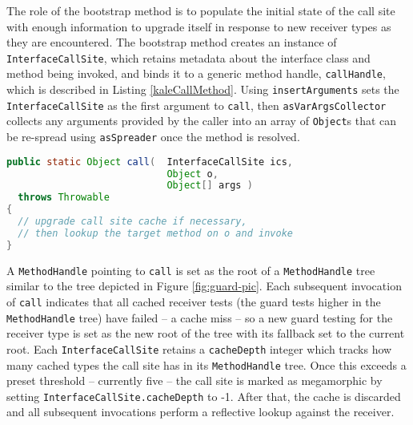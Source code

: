 The role of the bootstrap method is to populate the initial state of the call site with enough information to upgrade itself in response to new receiver types as they are encountered.  The bootstrap method creates an instance of \texttt{InterfaceCallSite}, which retains metadata about the interface class and method being invoked, and binds it to a generic method handle, \texttt{callHandle}, which is described in Listing \ref{kaleCallMethod}.  Using \texttt{insertArguments} sets the \texttt{InterfaceCallSite} as the first argument to \texttt{call}, then \texttt{asVarArgsCollector} collects any arguments provided by the caller into an array of \texttt{Object}s that can be re-spread using \texttt{asSpreader} once the method is resolved.

\begin{lstlisting}[language=Java,caption=Generalized interface invoker method,label=kaleCallMethod]
public static Object call(	InterfaceCallSite ics,
                            Object o,
                            Object[] args )
  throws Throwable
{
  // upgrade call site cache if necessary,
  // then lookup the target method on o and invoke
}
\end{lstlisting}

A \texttt{MethodHandle} pointing to \texttt{call} is set as the root of a \texttt{MethodHandle} tree similar to the tree depicted in Figure \ref{fig:guard-pic}.  Each subsequent invocation of \texttt{call} indicates that all cached receiver tests (the guard tests higher in the \texttt{MethodHandle} tree) have failed -- a cache miss -- so a new guard testing for the receiver type is set as the new root of the tree with its fallback set to the current root.  Each \texttt{InterfaceCallSite} retains a \texttt{cacheDepth} integer which tracks how many cached types the call site has in its \texttt{MethodHandle} tree.  Once this exceeds a preset threshold -- currently five -- the call site is marked as megamorphic by setting \texttt{InterfaceCallSite.cacheDepth} to -1.  After that, the cache is discarded and all subsequent invocations perform a reflective lookup against the receiver.

